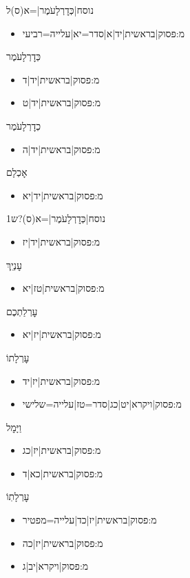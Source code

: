 \begin{itemize}
{{{{ \item {{נוסח|כְּדׇרְלָעֹמֶר|=א(ס)ל
\begin{itemize} \item {{מ:פסוק|בראשית|יד|א|סדר=יא|עלייה=רביעי}}
\end{itemize}
 \item כְּדׇרְלָעֹמֶר
\begin{itemize} \item {{מ:פסוק|בראשית|יד|ד}}\item {{מ:פסוק|בראשית|יד|ט}}
\end{itemize}
 \item כְדׇרְלָעֹמֶר
\begin{itemize} \item {{מ:פסוק|בראשית|יד|ה}}
\end{itemize}
 \item אׇכְלָם
\begin{itemize} \item {{מ:פסוק|בראשית|יד|יא}}
\end{itemize}
 \item {{נוסח|כְּדׇרְלָעֹמֶר|=א(ס)?ש1
\begin{itemize} \item {{מ:פסוק|בראשית|יד|יז}}
\end{itemize}
 \item עׇנְיֵֽךְ
\begin{itemize} \item {{מ:פסוק|בראשית|טז|יא}}
\end{itemize}
 \item עׇרְלַתְכֶם
\begin{itemize} \item {{מ:פסוק|בראשית|יז|יא}}
\end{itemize}
 \item עׇרְלָתוֹ
\begin{itemize} \item {{מ:פסוק|בראשית|יז|יד}}\item {{מ:פסוק|ויקרא|יט|כג|סדר=טז|עלייה=שלישי}}
\end{itemize}
 \item וַיָּמׇל
\begin{itemize} \item {{מ:פסוק|בראשית|יז|כג}}\item {{מ:פסוק|בראשית|כא|ד}}
\end{itemize}
 \item עׇרְלָתֽוֹ
\begin{itemize} \item {{מ:פסוק|בראשית|יז|כד|עלייה=מפטיר}}\item {{מ:פסוק|בראשית|יז|כה}}\item {{מ:פסוק|ויקרא|יב|ג}}

\end{itemize}}}}}}}}}
\end{itemize}
